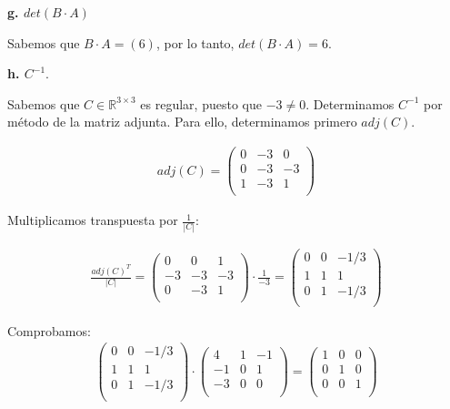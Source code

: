 \documentclass[11pt]{article}
\begin{document}
\textbf{g. \(det(B\cdot A)\)}

Sabemos que \(B\cdot A = (6)\),
por lo tanto,
\(det(B\cdot A) = 6\).

\textbf{h. \(C^{-1}\)}.

Sabemos que \(C \in \mathbb{R}^{3 \times 3}\) es regular,
puesto que \(-3 \neq 0\).
Determinamos \(C^{-1}\) por método de la matriz adjunta.
Para ello, determinamos primero \(adj(C)\).

\begin{align*}
  adj(C) = \begin{pmatrix}
             0 & -3 & 0  \\
             0 & -3 & -3 \\
             1 & -3 & 1  \\
           \end{pmatrix}
\end{align*}

Multiplicamos transpuesta por \(\frac{1}{|C|}\):

\begin{align*}
  \frac{adj(C)^{T}}{|C|}
  =
  \begin{pmatrix}
    0  & 0  & 1  \\
    -3 & -3 & -3 \\
    0  & -3 & 1  \\
  \end{pmatrix}
  \cdot
  \frac{1}{-3}
  =
  \boxed{
    \begin{pmatrix}
      0 & 0 & -1/3 \\
      1 & 1 & 1    \\
      0 & 1 & -1/3 \\
    \end{pmatrix}
  }
\end{align*}

Comprobamos:
\begin{align*}
  \begin{pmatrix}
    0 & 0 & -1/3 \\
    1 & 1 & 1    \\
    0 & 1 & -1/3 \\
  \end{pmatrix}
  \cdot
  \begin{pmatrix}
    4  & 1 & -1 \\
    -1 & 0 & 1  \\
    -3 & 0 & 0  \\
  \end{pmatrix}
  =
  \begin{pmatrix}
    1 & 0 & 0 \\
    0 & 1 & 0 \\
    0 & 0 & 1 \\
  \end{pmatrix}
\end{align*}
\end{document}
